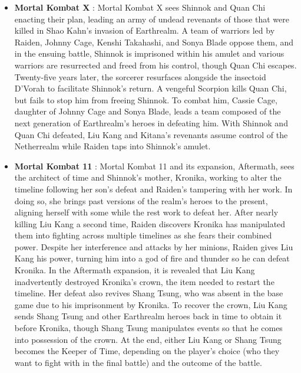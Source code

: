 \documentclass[12pt]{article}
\begin{document}
\begin{itemize}
    \item \textbf{Mortal Kombat X }: Mortal Kombat X sees Shinnok and Quan Chi enacting their plan, leading an army of undead revenants of those that were killed in Shao Kahn's invasion of Earthrealm. A team of warriors led by Raiden, Johnny Cage, Kenshi Takahashi, and Sonya Blade oppose them, and in the ensuing battle, Shinnok is imprisoned within his amulet and various warriors are resurrected and freed from his control, though Quan Chi escapes. Twenty-five years later, the sorcerer resurfaces alongside the insectoid D'Vorah to facilitate Shinnok's return. A vengeful Scorpion kills Quan Chi, but fails to stop him from freeing Shinnok. To combat him, Cassie Cage, daughter of Johnny Cage and Sonya Blade, leads a team composed of the next generation of Earthrealm's heroes in defeating him. With Shinnok and Quan Chi defeated, Liu Kang and Kitana's revenants assume control of the Netherrealm while Raiden taps into Shinnok's amulet.
    
    \item \textbf{Mortal Kombat 11 }: Mortal Kombat 11 and its expansion, Aftermath, sees the architect of time and Shinnok's mother, Kronika, working to alter the timeline following her son's defeat and Raiden's tampering with her work. In doing so, she brings past versions of the realm's heroes to the present, aligning herself with some while the rest work to defeat her. After nearly killing Liu Kang a second time, Raiden discovers Kronika has manipulated them into fighting across multiple timelines as she fears their combined power. Despite her interference and attacks by her minions, Raiden gives Liu Kang his power, turning him into a god of fire and thunder so he can defeat Kronika. In the Aftermath expansion, it is revealed that Liu Kang inadvertently destroyed Kronika's crown, the item needed to restart the timeline. Her defeat also revives Shang Tsung, who was absent in the base game due to his imprisonment by Kronika. To recover the crown, Liu Kang sends Shang Tsung and other Earthrealm heroes back in time to obtain it before Kronika, though Shang Tsung manipulates events so that he comes into possession of the crown. At the end, either Liu Kang or Shang Tsung becomes the Keeper of Time, depending on the player's choice (who they want to fight with in the final battle) and the outcome of the battle.
\end{itemize}
\end{document}
